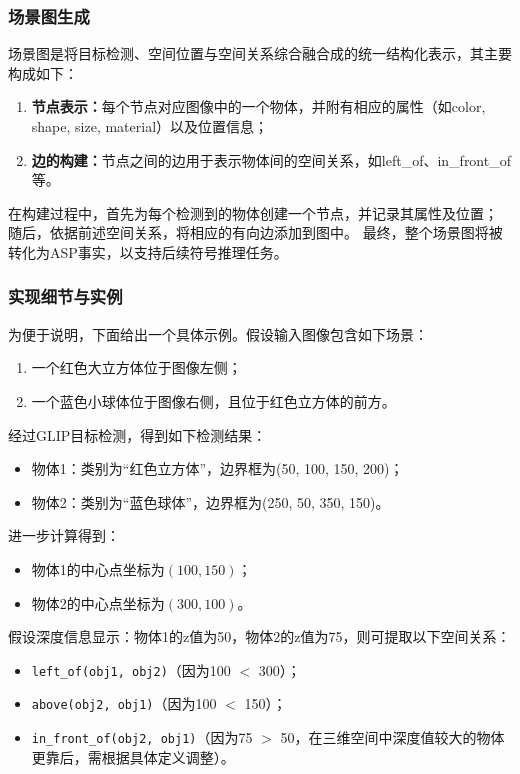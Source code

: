 \subsubsection{场景图生成}
场景图是将目标检测、空间位置与空间关系综合融合成的统一结构化表示，其主要构成如下： 
\begin{enumerate}[nosep] 
    \item \textbf{节点表示：}每个节点对应图像中的一个物体，并附有相应的属性（如color, shape, size, material）以及位置信息； 
    \item \textbf{边的构建：}节点之间的边用于表示物体间的空间关系，如left\_of、in\_front\_of等。 
\end{enumerate}

在构建过程中，首先为每个检测到的物体创建一个节点，并记录其属性及位置；
随后，依据前述空间关系，将相应的有向边添加到图中。
最终，整个场景图将被转化为ASP事实，以支持后续符号推理任务。
\subsubsection{实现细节与实例}
为便于说明，下面给出一个具体示例。假设输入图像包含如下场景： 
\begin{enumerate}[nosep] 
    \item 一个红色大立方体位于图像左侧； 
    \item 一个蓝色小球体位于图像右侧，且位于红色立方体的前方。 
\end{enumerate}

经过GLIP目标检测，得到如下检测结果： 
\begin{itemize}[itemsep=0pt,parsep=0pt] 
    \item 物体1：类别为“红色立方体”，边界框为(50, 100, 150, 200)； 
    \item 物体2：类别为“蓝色球体”，边界框为(250, 50, 350, 150)。 
\end{itemize}

进一步计算得到： 
\begin{itemize}[itemsep=0pt,parsep=0pt] 
    \item 物体1的中心点坐标为$(100,150)$； 
    \item 物体2的中心点坐标为$(300,100)$。 
\end{itemize}

假设深度信息显示：物体1的z值为50，物体2的z值为75，则可提取以下空间关系： 
\begin{itemize}[itemsep=0pt,parsep=0pt] 
    \item \texttt{left\_of(obj1, obj2)}（因为100 $<$ 300）； 
    \item \texttt{above(obj2, obj1)}（因为100 $<$ 150）； 
    \item \texttt{in\_front\_of(obj2, obj1)}（因为75 $>$ 50，在三维空间中深度值较大的物体更靠后，需根据具体定义调整）。 
\end{itemize}

